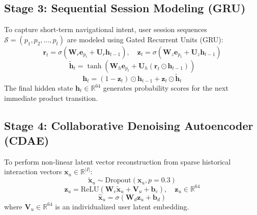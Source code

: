 \documentclass[conference]{IEEEtran}
\begin{document}
\subsection{Stage 3: Sequential Session Modeling (GRU)}
To capture short-term navigational intent, user session sequences $\mathcal{S} = (p_1, p_2, \dots, p_t)$ are modeled using Gated Recurrent Units (GRU):
\begin{equation}
\mathbf{r}_t = \sigma(\mathbf{W}_r \mathbf{e}_{p_t} + \mathbf{U}_r \mathbf{h}_{t-1}), \quad \mathbf{z}_t = \sigma(\mathbf{W}_z \mathbf{e}_{p_t} + \mathbf{U}_z \mathbf{h}_{t-1})
\end{equation}
\begin{equation}
\tilde{\mathbf{h}}_t = \tanh(\mathbf{W}_h \mathbf{e}_{p_t} + \mathbf{U}_h (\mathbf{r}_t \odot \mathbf{h}_{t-1}))
\end{equation}
\begin{equation}
\mathbf{h}_t = (1 - \mathbf{z}_t) \odot \mathbf{h}_{t-1} + \mathbf{z}_t \odot \tilde{\mathbf{h}}_t
\end{equation}
The final hidden state $\mathbf{h}_t \in \mathbb{R}^{64}$ generates probability scores for the next immediate product transition.

\subsection{Stage 4: Collaborative Denoising Autoencoder (CDAE)}
To perform non-linear latent vector reconstruction from sparse historical interaction vectors $\mathbf{x}_u \in \mathbb{R}^{|I|}$:
\begin{equation}
\tilde{\mathbf{x}}_u \sim \text{Dropout}(\mathbf{x}_u, p=0.3)
\end{equation}
\begin{equation}
\mathbf{z}_u = \text{ReLU}\left(\mathbf{W}_e \tilde{\mathbf{x}}_u + \mathbf{V}_u + \mathbf{b}_e\right), \quad \mathbf{z}_u \in \mathbb{R}^{64}
\end{equation}
\begin{equation}
\hat{\mathbf{x}}_u = \sigma(\mathbf{W}_d \mathbf{z}_u + \mathbf{b}_d)
\end{equation}
where $\mathbf{V}_u \in \mathbb{R}^{64}$ is an individualized user latent embedding.
\end{document}
